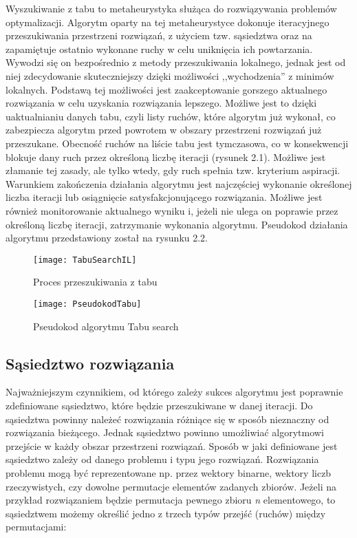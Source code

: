 Wyszukiwanie z tabu to metaheurystyka służąca do rozwiązywania problemów optymalizacji. Algorytm oparty na tej metaheurystyce dokonuje iteracyjnego przeszukiwania przestrzeni rozwiązań, z użyciem tzw. sąsiedztwa oraz na zapamiętuje ostatnio wykonane ruchy w celu uniknięcia ich powtarzania. Wywodzi się on bezpośrednio z metody przeszukiwania lokalnego, jednak jest od niej zdecydowanie skuteczniejszy dzięki możliwości ,,wychodzenia'' z minimów lokalnych. Podstawą tej możliwości jest zaakceptowanie gorszego aktualnego rozwiązania w celu uzyskania rozwiązania lepszego. Możliwe jest to dzięki uaktualnianiu danych tabu, czyli listy ruchów, które algorytm już wykonał, co zabezpiecza algorytm przed powrotem w obszary przestrzeni rozwiązań już przeszukane. Obecność ruchów na liście tabu jest tymczasowa, co w konsekwencji blokuje dany ruch przez określoną liczbę iteracji (rysunek 2.1). Możliwe jest złamanie tej zasady, ale tylko wtedy, gdy ruch spełnia tzw. kryterium aspiracji. Warunkiem zakończenia działania algorytmu jest najczęściej wykonanie określonej liczba iteracji lub osiągnięcie satysfakcjonującego rozwiązania. Możliwe jest również monitorowanie aktualnego wyniku i, jeżeli nie ulega on poprawie przez określoną liczbę iteracji, zatrzymanie wykonania algorytmu. Pseudokod działania algorytmu przedstawiony został na rysunku 2.2.

\begin{figure}
	\centering
	\texttt{[image: TabuSearchIL]}
	\caption{Proces przeszukiwania z tabu}
	\label{fig: TabuSearchIL}
\end{figure}

\begin{figure}
	\centering
	\texttt{[image: PseudokodTabu]}
	\caption{Pseudokod algorytmu Tabu search}
	\label{fig: AlgorytmTabu}
\end{figure}

\subsection{Sąsiedztwo rozwiązania}

Najważniejszym czynnikiem, od którego zależy sukces algorytmu jest poprawnie zdefiniowane sąsiedztwo, które będzie przeszukiwane w danej iteracji. Do sąsiedztwa powinny należeć rozwiązania różniące się w sposób nieznaczny od rozwiązania bieżącego. Jednak sąsiedztwo powinno umożliwiać algorytmowi przejście w każdy obszar przestrzeni rozwiązań. Sposób w jaki definiowane jest sąsiedztwo zależy od danego problemu i typu jego rozwiązań. Rozwiązania problemu mogą być reprezentowane np. przez wektory binarne, wektory liczb rzeczywistych, czy dowolne permutacje elementów zadanych zbiorów. Jeżeli na przykład rozwiązaniem będzie permutacja pewnego zbioru \textit{n} elementowego, to sąsiedztwem możemy określić jedno z trzech typów przejść (ruchów) między permutacjami:

